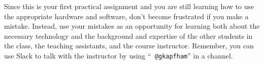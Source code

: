 Since this is your first practical assignment and you are still learning how to use the appropriate hardware and
software, don't become frustrated if you make a mistake. Instead, use your mistakes as an opportunity for learning both
about the necessary technology and the background and expertise of the other students in the class, the teaching
assistants, and the course instructor. Remember, you can use Slack to talk with the instructor by using ``{\tt
@gkapfham}'' in a channel.



